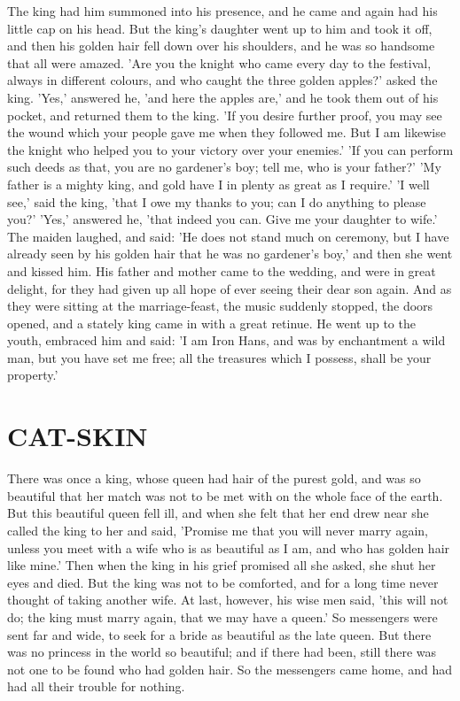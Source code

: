 \documentclass[12pt]{book}
\begin{document}
The king had him summoned into his presence, and he came and again had
his little cap on his head. But the king's daughter went up to him and
took it off, and then his golden hair fell down over his shoulders,
and he was so handsome that all were amazed. 'Are you the knight who
came every day to the festival, always in different colours, and who
caught the three golden apples?' asked the king. 'Yes,' answered he,
'and here the apples are,' and he took them out of his pocket, and
returned them to the king. 'If you desire further proof, you may see
the wound which your people gave me when they followed me. But I am
likewise the knight who helped you to your victory over your enemies.'
'If you can perform such deeds as that, you are no gardener's boy;
tell me, who is your father?' 'My father is a mighty king, and gold
have I in plenty as great as I require.' 'I well see,' said the king,
'that I owe my thanks to you; can I do anything to please you?' 'Yes,'
answered he, 'that indeed you can. Give me your daughter to wife.' The
maiden laughed, and said: 'He does not stand much on ceremony, but I
have already seen by his golden hair that he was no gardener's boy,'
and then she went and kissed him. His father and mother came to the
wedding, and were in great delight, for they had given up all hope of
ever seeing their dear son again. And as they were sitting at the
marriage-feast, the music suddenly stopped, the doors opened, and a
stately king came in with a great retinue. He went up to the youth,
embraced him and said: 'I am Iron Hans, and was by enchantment a wild
man, but you have set me free; all the treasures which I possess,
shall be your property.'



\chapter{CAT-SKIN}

There was once a king, whose queen had hair of the purest gold, and
was so beautiful that her match was not to be met with on the whole
face of the earth. But this beautiful queen fell ill, and when she
felt that her end drew near she called the king to her and said,
'Promise me that you will never marry again, unless you meet with a
wife who is as beautiful as I am, and who has golden hair like mine.'
Then when the king in his grief promised all she asked, she shut her
eyes and died. But the king was not to be comforted, and for a long
time never thought of taking another wife. At last, however, his wise
men said, 'this will not do; the king must marry again, that we may
have a queen.' So messengers were sent far and wide, to seek for a
bride as beautiful as the late queen. But there was no princess in the
world so beautiful; and if there had been, still there was not one to
be found who had golden hair. So the messengers came home, and had had
all their trouble for nothing.
\end{document}
